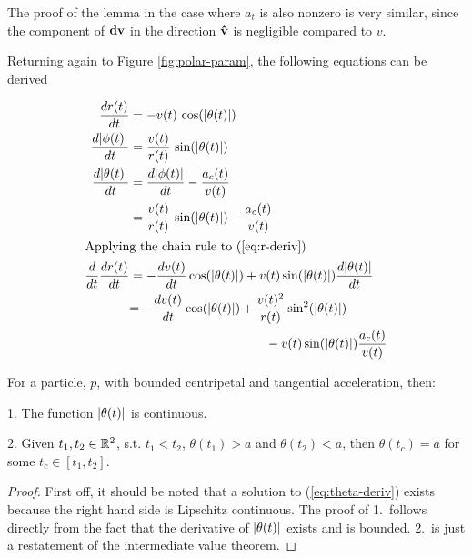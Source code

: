 The proof of the lemma in the case where $a_t$ is also nonzero is very similar, since the component of $\mathbf{dv}$ in the direction $\mathbf{\hat{v}}$ is negligible compared to $v$.

Returning again to Figure \ref{fig:polar-param}, the following equations can be derived

\begin{align}
  \frac{dr(t)}{dt}& = -v(t) \, \cos\paren{\abs{\theta(t)}}\label{eq:r-deriv}\\
  \frac{d\abs{\phi(t)}}{dt}& = \frac{v(t)}{r(t)} \, \sin\paren{\abs{\theta(t)}}\label{eq:phi-deriv}\\
  \frac{d\abs{\theta(t)}}{dt}& = \frac{d\abs{\phi(t)}}{dt} - \frac{a_c(t)}{v(t)}\\
  &= \frac{v(t)}{r(t)} \, \sin\paren{\abs{\theta(t)}} - \frac{a_c(t)}{v(t)}\label{eq:theta-deriv}\\
  \intertext{Applying the chain rule to (\ref{eq:r-deriv})}
  \frac{d}{dt} \frac{dr(t)}{dt}& = -\frac{dv(t)}{dt} \cos\paren{\abs{\theta(t)}} + v(t) \sin\paren{\abs{\theta(t)}} \frac{d\abs{\theta(t)}}{dt}\\
  &\begin{aligned}
    = -\frac{dv(t)}{dt} \cos\paren{\abs{\theta(t)}} &+ \frac{v(t)^2}{r(t)} \sin^2\paren{\abs{\theta(t)}}\\
    &\qquad - v(t) \sin\paren{\abs{\theta(t)}} \frac{a_c(t)}{v(t)}\label{eq:r-deriv-2}
  \end{aligned}
\end{align}

\begin{lemma}\label{lemma:intermediate-theta}
  For a particle, $p$, with bounded centripetal and tangential acceleration, then: 

  1. The function $\abs{\theta(t)}$ is continuous. 

  2. Given $t_1, t_2 \in \mathbb R^2$, s.t. $t_1 < t_2$, $\theta(t_1) > a$ and $\theta(t_2) < a$, then $\theta(t_c) = a$ for some $t_c \in [t_1, t_2]$.
\end{lemma}

\begin{proof}
First off, it should be noted that a solution to (\ref{eq:theta-deriv}) exists because the right hand side is Lipschitz continuous. The proof of 1.\ follows directly from the fact that the derivative of $\abs{\theta(t)}$ exists and is bounded. 2.\ is just a restatement of the intermediate value theorem.
\end{proof}

